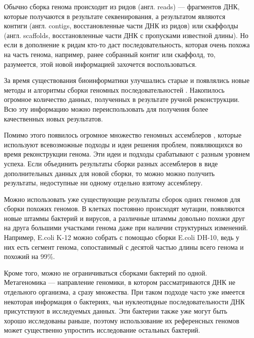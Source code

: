 \documentclass[14pt]{matmex-diploma-custom}
\begin{document}
Обычно сборка генома происходит из ридов (англ. reads) --- фрагментов ДНК, которые получаются в результате секвенирования, а результатом являются контиги (англ. contigs, восстановленные части ДНК из ридов) или скаффолды (англ. scaffolds, восстановленные части ДНК с пропусками известной длины). Но если в дополнение к ридам кто-то даст последовательность, которая очень похожа на часть генома, например, ранее собранный контиг или скаффолд, то, разумеется, этой новой информацией захочется воспользоваться.

За время существования биоинформатики улучшались старые и появлялись новые методы и алгоритмы сборки геномных последовательностей \cite{art:simpson2015theory}. Накопилось огромное количество данных, полученных в результате ручной реконструкции. Всю эту информацию можно переиспользовать для получения более качественных новых результатов.

Помимо этого появилось огромное множество геномных ассемблеров \cite{art:zimin2013masurca, art:sommer2007minimus, art:georganas2015hipmer, art:batzoglou2002arachne, art:abu2015spaler}, которые используют всевозможные подходы и идеи решения проблем, появляющихся во время реконструкции генома. Эти идеи и подходы срабатывают с разным уровнем успеха. Если объединить результаты сборки разных ассемблеров в виде дополнительных данных для новой сборки, то можно можно получить результаты, недоступные ни одному отдельно взятому ассемблеру.

Можно использовать уже существующие результаты сборок одних геномов для сборки похожих геномов. В клетках постоянно происходят мутации, появляются новые штаммы бактерий и вирусов, а различные штаммы довольно похожи друг на друга большими участками генома даже при наличии структурных изменений. Например, E.coli K-12 можно собрать с помощью сборки E.coli DH-10, ведь у них есть сегмент генома, сопоставимый с десятой частью длины всего генома и похожий на 99\%.

Кроме того, можно не ограничиваться сборками бактерий по одной. Метагеномика --- направление геномики, в котором рассматриваются ДНК не отдельного организма, а сразу множества. При таком подходе часто уже имеется некоторая информация о бактериях, чьи нуклеотидные последовательности ДНК присутствуют в исследуемых данных. Эти бактерии также уже могут быть хорошо исследованы раньше, поэтому использование их референсных геномов может существенно упростить исследование остальных бактерий. 
\end{document}
